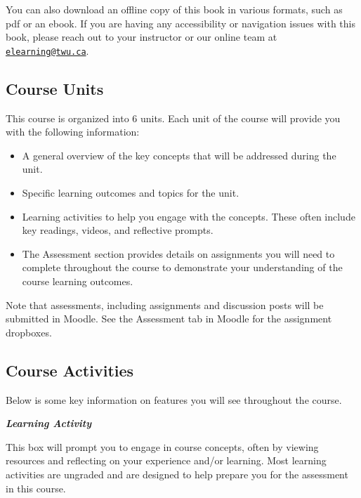 \documentclass[
]{book}
\providecommand{\tightlist}{%
  \setlength{\itemsep}{0pt}\setlength{\parskip}{0pt}}
\begin{document}
You can also download an offline copy of this book in various formats, such as pdf or an ebook. If you are having any accessibility or navigation issues with this book, please reach out to your instructor or our online team at \href{mailto:elearning@twu.ca}{\nolinkurl{elearning@twu.ca}}.

\hypertarget{course-units}{%
\subsection*{Course Units}\label{course-units}}

This course is organized into 6 units. Each unit of the course will provide you with the following information:

\begin{itemize}
\tightlist
\item
  A general overview of the key concepts that will be addressed during the unit.\\
\item
  Specific learning outcomes and topics for the unit.\\
\item
  Learning activities to help you engage with the concepts. These often include key readings, videos, and reflective prompts.\\
\item
  The Assessment section provides details on assignments you will need to complete throughout the course to demonstrate your understanding of the course learning outcomes.
\end{itemize}

\begin{caution}
Note that assessments, including assignments and discussion posts will be submitted in Moodle. See the Assessment tab in Moodle for the assignment dropboxes.
\end{caution}

\hypertarget{course-activities}{%
\subsection*{Course Activities}\label{course-activities}}

Below is some key information on features you will see throughout the course.

\begin{reflect}
\textbf{\emph{Learning Activity}}

This box will prompt you to engage in course concepts, often by viewing resources and reflecting on your experience and/or learning. Most learning activities are ungraded and are designed to help prepare you for the assessment in this course.
\end{reflect}
\end{document}
